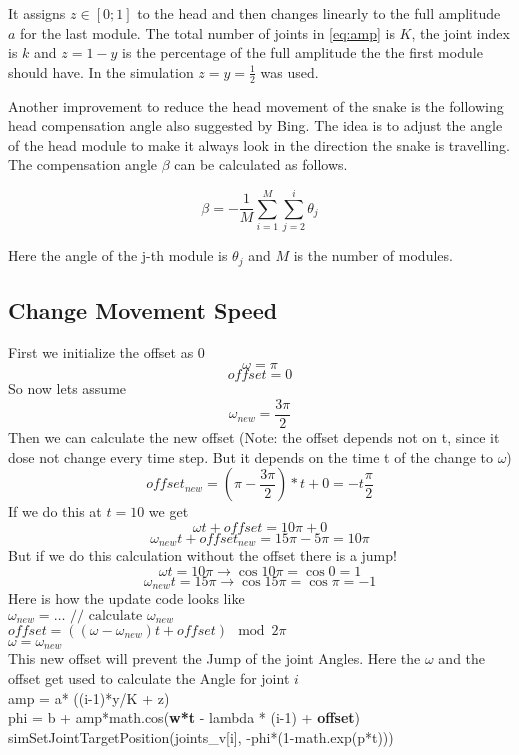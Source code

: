 It assigns $z \in \left[0; 1\right]$ to the head and then changes linearly to the full amplitude $ a$ for the last module. The total number of joints in \ref{eq:amp} is $ K $, the joint index is $k$ and $z = 1 - y$ is the percentage of the full amplitude the the first module should have. In the simulation $ z = y = \frac{1}{2} $ was used.

Another improvement to reduce the head movement of the snake is the following head compensation angle also suggested by Bing\cite{Bing}. The idea is to adjust the angle of the head module to make it always look in the direction the snake is travelling. The compensation angle $ \beta $ can be calculated as follows.

\begin{equation}\label{eq:comp}
\beta = - \frac{1}{M}\sum_{i = 1}^{M}\sum_{j = 2}^{i} \theta_j
\end{equation}

Here the angle of the j-th module is $ \theta_j $ and $M$ is the number of modules.


\subsection{Change Movement Speed}


First we initialize the offset as 0
\[ \omega = \pi \]
\[ offset = 0 \]
So now lets assume
\[ \omega_{new} = \frac{3\pi}{2} \]
Then we can calculate the new offset (Note: the offset depends not on t, since it dose not change every time step. But it depends on the time t of the change to $\omega$)
\[ offset_{new} = (\pi - \frac{3\pi}{2}) * t + 0 = -t\frac{\pi}{2} \]
If we do this at $t = 10$ we get
\[ \omega t + offset = 10\pi + 0 \]
\[ \omega_{new}t + offset_{new} = 15\pi - 5\pi = 10\pi \]
But if we do this calculation without the offset there is a jump!
\[ \omega t = 10\pi \rightarrow \cos10\pi = \cos0 = 1 \]
\[ \omega_{new}t = 15\pi \rightarrow \cos15\pi = \cos\pi = -1 \]
Here is how the update code looks like\\
$ \omega_{new} = \dots \text{ // calculate } \omega_{new} $\\
$ offset = ((\omega - \omega_{new}) t + offset) \mod 2\pi $\\
$\omega = \omega_{new}$ \\
This new offset will prevent the Jump of the joint Angles.
Here the $\omega$ and the offset get used to calculate the Angle for joint $i$\\
amp = a* ((i-1)*y/K + z)\\
phi = b + amp*math.cos(\textbf{w*t} - lambda * (i-1) + \textbf{offset})\\
simSetJointTargetPosition(joints\_v[i], -phi*(1-math.exp(p*t)))\\

